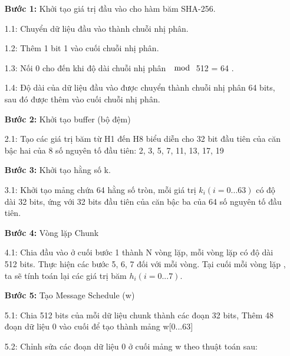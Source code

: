 \begin{itemize}
    \item[\textbf{Bước 1: }] Khởi tạo giá trị đầu vào cho hàm băm SHA-256.
        \item[1.1:] Chuyển dữ liệu đầu vào thành chuỗi nhị phân.
        \item[1.2:] Thêm 1 bit 1 vào cuối chuỗi nhị phân.
        \item[1.3:] Nối 0 cho đến khi độ dài chuỗi nhị phân $\mod$ 512 = 64 .
        \item[1.4:] Độ dài của dữ liệu đầu vào được chuyển thành chuỗi nhị phân 64 bits, 
        sau đó được thêm vào cuối chuỗi nhị phân. 
    \item[\textbf{Bước 2:}] Khởi tạo buffer (bộ đệm)
        \item[2.1:] Tạo các giá trị băm từ H1 đến H8 biểu diễn cho 32 bit đầu tiên của
        căn bậc hai của 8 số nguyên tố đầu tiên: 2, 3, 5, 7, 11, 13, 17, 19
    \item[\textbf{Bước 3:}] Khởi tạo hằng số k.
        \item[3.1:] Khởi tạo mảng chứa 64 hằng số tròn, mỗi giá trị $k_i (i = 0...63)$
        có độ dài 32 bits, ứng với 32 bits đầu tiên của căn bậc ba của 64 số nguyên tố 
        đầu tiên.
    \item[\textbf{Bước 4:}] Vòng lặp Chunk
        \item[4.1:] Chia đầu vào ở cuối bước 1 thành N vòng lặp, mỗi vòng lặp có độ
        dài 512 bits.
        Thực hiện các bước 5, 6, 7 đối với mỗi vòng. Tại cuối mỗi vòng
        lặp , ta sẽ tính toán lại các giá trị băm $h_i (i = 0...7)$. 
    \item[\textbf{Bước 5:}] Tạo Message Schedule (w)
        \item[5.1:] Chia 512 bits của mỗi dữ liệu chunk thành các đoạn 32 bits,
        Thêm 48 đoạn dữ liệu 0 vào cuối để tạo thành mảng w[0...63]
        \item[5.2:] Chỉnh sửa các đoạn dữ liệu 0 ở cuối mảng w theo thuật toán sau:


\end{itemize}
